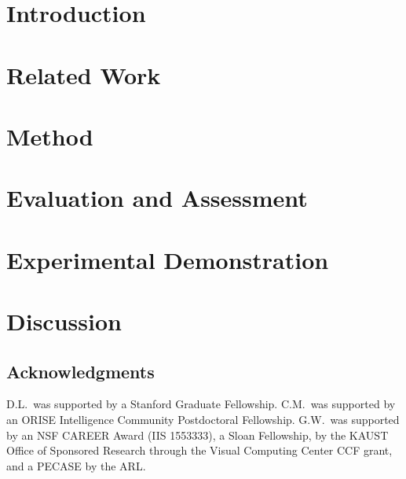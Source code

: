 \documentclass[runningheads]{llncs}
\begin{document}
\vspace{-5pt}
\section{Introduction}
\vspace{-5pt}
\label{sec:intro}


\vspace{-5pt}
\section{Related Work}
\vspace{-5pt}
\label{sec:related}


\vspace{-5pt}
\section{Method}
\vspace{-5pt}
\label{sec:method}


\vspace{-5pt}
\section{Evaluation and Assessment}
\vspace{-5pt}
\label{sec:evaluation}


\vspace{-5pt}
\section{Experimental Demonstration}
\vspace{-5pt}
\label{sec:prototype}


\vspace{-5pt}
\section{Discussion}
\vspace{-5pt}
\label{sec:discussion}


\vspace{-4 pt}
\subsection*{Acknowledgments}
D.L.~was supported by a Stanford Graduate Fellowship. 
C.M.~was supported by an ORISE Intelligence Community Postdoctoral Fellowship. G.W.~was supported by an NSF CAREER Award (IIS 1553333), a Sloan Fellowship, by the KAUST Office of Sponsored Research through the Visual Computing Center CCF grant, and a PECASE by the ARL. 


\clearpage
%
%

% 

\end{document}
